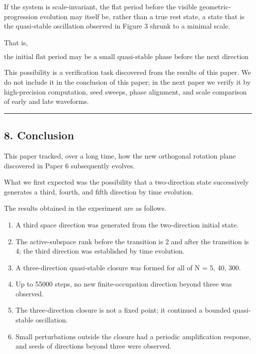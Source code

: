 \documentclass[
  a4paper,
]{article}
\providecommand{\tightlist}{%
  \setlength{\itemsep}{0pt}\setlength{\parskip}{0pt}}
\begin{document}
If the system is scale-invariant, the flat period before the visible
geometric-progression evolution may itself be, rather than a true rest
state, a state that is the quasi-stable oscillation observed in Figure 3
shrunk to a minimal scale.

That is,

\[
\boxed{
\text{the initial flat period may be a small quasi-stable phase before the next direction creation.}
}
\]

This possibility is a verification task discovered from the results of
this paper. We do not include it in the conclusion of this paper; in the
next paper we verify it by high-precision computation, seed sweeps,
phase alignment, and scale comparison of early and late waveforms.

\begin{center}\rule{0.5\linewidth}{0.5pt}\end{center}

\subsection{8. Conclusion}\label{conclusion}

This paper tracked, over a long time, how the new orthogonal rotation
plane discovered in Paper 6 subsequently evolves.

What we first expected was the possibility that a two-direction state
successively generates a third, fourth, and fifth direction by time
evolution.

The results obtained in the experiment are as follows.

\begin{enumerate}
\def\labelenumi{\arabic{enumi}.}
\tightlist
\item
  A third space direction was generated from the two-direction initial
  state.
\item
  The active-subspace rank before the transition is 2 and after the
  transition is 4; the third direction was established by time
  evolution.
\item
  A three-direction quasi-stable closure was formed for all of N = 5,
  40, 300.
\item
  Up to 55000 steps, no new finite-occupation direction beyond three was
  observed.
\item
  The three-direction closure is not a fixed point; it continued a
  bounded quasi-stable oscillation.
\item
  Small perturbations outside the closure had a periodic amplification
  response, and seeds of directions beyond three were observed.
\end{enumerate}
\end{document}
